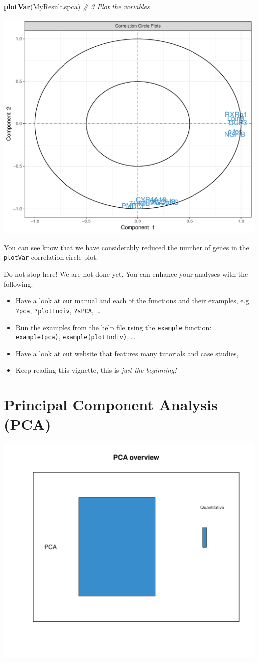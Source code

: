 \documentclass[]{book}
\newenvironment{Shaded}{\begin{snugshade}}{\end{snugshade}}
\newcommand{\CommentTok}[1]{\textcolor[rgb]{0.56,0.35,0.01}{\textit{#1}}}
\newcommand{\KeywordTok}[1]{\textcolor[rgb]{0.13,0.29,0.53}{\textbf{#1}}}
\newcommand{\NormalTok}[1]{#1}
\begin{document}
\begin{Shaded}
\begin{Highlighting}[]
\KeywordTok{plotVar}\NormalTok{(MyResult.spca)                 }\CommentTok{# 3 Plot the variables}
\end{Highlighting}
\end{Shaded}

\begin{center}\includegraphics[width=0.5\linewidth,]{Figures/02-spca-nutrimouse-2} \end{center}

You can see know that we have considerably reduced the number of genes in the \texttt{plotVar} correlation circle plot.

Do not stop here! We are not done yet. You can enhance your analyses with the following:

\begin{itemize}
\item
  Have a look at our manual and each of the functions and their examples, e.g. \texttt{?pca}, \texttt{?plotIndiv}, \texttt{?sPCA}, \ldots{}
\item
  Run the examples from the help file using the \texttt{example} function: \texttt{example(pca)}, \texttt{example(plotIndiv)}, \ldots{}
\item
  Have a look at out \href{http://www.mixomics.org}{website} that features many tutorials and case studies,
\item
  Keep reading this vignette, this is \emph{just the beginning!}
\end{itemize}

\hypertarget{pca}{%
\chapter{Principal Component Analysis (PCA)}\label{pca}}

\begin{center}\includegraphics[width=0.5\linewidth,]{Figures/03-overview-PCA-1} \end{center}
\end{document}
